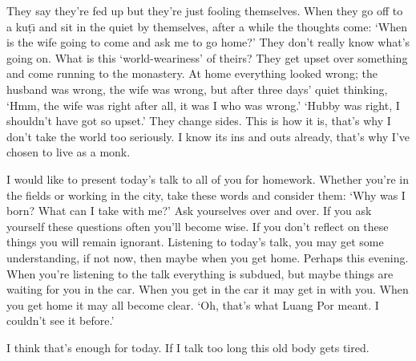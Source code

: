 They say they're fed up but they're just fooling themselves. When they go off to a ku\d{t}\={\i} and sit in the quiet by themselves, after a while the thoughts come: `When is the wife going to come and ask me to go home?' They don't really know what's going on. What is this `world-weariness' of theirs? They get upset over something and come running to the monastery. At home everything looked wrong; the husband was wrong, the wife was wrong, but after three days' quiet thinking, `Hmm, the wife was right after all, it was I who was wrong.' `Hubby was right, I shouldn't have got so upset.' They change sides. This is how it is, that's why I don't take the world too seriously. I know its ins and outs already, that's why I've chosen to live as a monk. 

I would like to present today's talk to all of you for homework. Whether you're in the fields or working in the city, take these words and consider them: `Why was I born? What can I take with me?' Ask yourselves over and over. If you ask yourself these questions often you'll become wise. If you don't reflect on these things you will remain ignorant. Listening to today's talk, you may get some understanding, if not now, then maybe when you get home. Perhaps this evening. When you're listening to the talk everything is subdued, but maybe things are waiting for you in the car. When you get in the car it may get in with you. When you get home it may all become clear. `Oh, that's what Luang Por meant. I couldn't see it before.' 

I think that's enough for today. If I talk too long this old body gets tired. 

